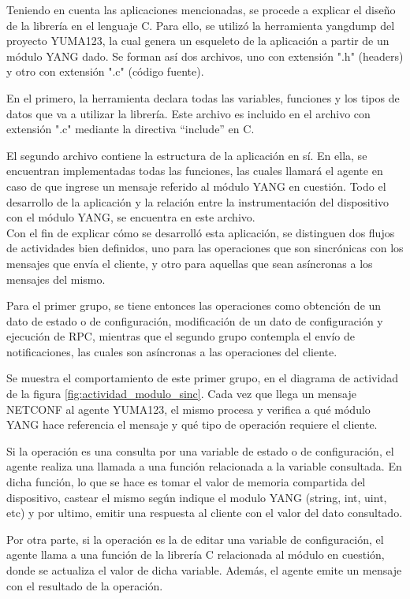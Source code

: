   Teniendo en cuenta las aplicaciones mencionadas, se procede a explicar el diseño de la librería en el lenguaje C. Para ello, se utilizó la herramienta yangdump del proyecto YUMA123, la cual genera un esqueleto de la aplicación a partir de un módulo YANG dado. Se forman así dos archivos, uno con extensión ".h" (headers) y otro con extensión ".c" (código fuente). 
  

  En el primero, la herramienta declara todas las variables, funciones y los tipos de datos que va a utilizar la librería. Este archivo es incluido en el archivo con extensión ".c" mediante la directiva “include” en C.

  El segundo archivo contiene la estructura de la aplicación en sí. En ella, se encuentran implementadas todas las funciones, las cuales llamará el agente en caso de que ingrese un mensaje referido al módulo YANG en cuestión. Todo el desarrollo de la aplicación y la relación entre la instrumentación del dispositivo con el módulo YANG, se encuentra en este archivo. 
  \\

  Con el fin de explicar cómo se desarrolló esta aplicación, se distinguen dos flujos de actividades bien definidos, uno para las operaciones que son sincrónicas con los mensajes que envía el cliente, y otro para aquellas que sean asíncronas a los mensajes del mismo. 

  Para el primer grupo, se tiene entonces las operaciones como obtención de un dato de estado o de configuración, modificación de un dato de configuración y ejecución de RPC, mientras que el segundo grupo contempla el envío de notificaciones, las cuales son asíncronas a las operaciones del cliente.
  \newpage

  Se muestra el comportamiento de este primer grupo, en el diagrama de actividad de la figura \ref{fig:actividad_modulo_sinc}. Cada vez que llega un mensaje NETCONF al agente YUMA123, el mismo procesa y verifica a qué módulo YANG hace referencia el mensaje y qué tipo de operación requiere el cliente. 

  Si la operación es una consulta por una variable de estado o de configuración, el agente realiza una llamada a una función relacionada a la variable consultada. En dicha función, lo que se hace es tomar el valor de memoria compartida del dispositivo, castear el mismo según indique el modulo YANG (string, int, uint, etc) y por ultimo, emitir una respuesta al cliente con el valor del dato consultado.

  Por otra parte, si la operación es la de editar una variable de configuración, el agente llama a una función de la librería C relacionada al módulo en cuestión, donde se actualiza el valor de dicha variable. Además, el agente emite un mensaje con el resultado de la operación. 

